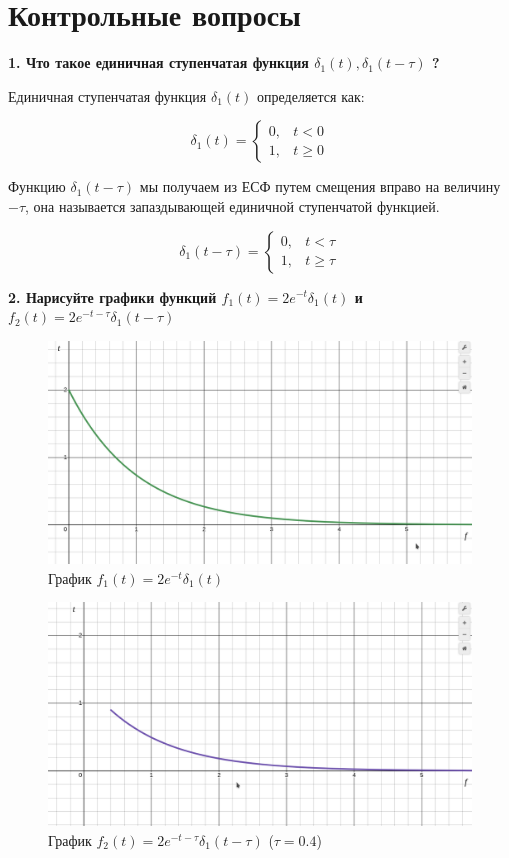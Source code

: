 \section{Контрольные вопросы}

\textbf{
    1. Что такое единичная ступенчатая функция
    $ \delta_{1}(t), \delta_{1}(t-\tau) $ ?
}

Единичная ступенчатая функция $ \delta_{1}(t) $ 
определяется как:

\begin{equation}\label{eq:esf}
\delta_{1}(t) = 
\begin{cases}
    0, & t < 0\\
    1, & t \ge 0
\end{cases}
\end{equation}

Функцию $ \delta_{1}(t-\tau) $  мы получаем из ЕСФ путем смещения вправо на величину $ -\tau $, она называется запаздывающей единичной ступенчатой функцией.

\begin{equation}\label{eq:esft}
\delta_{1}(t-\tau) = 
\begin{cases}
0, & t < \tau\\
1, & t \ge \tau
\end{cases}
\end{equation} 

\textbf{
    2. Нарисуйте графики функций 
    $ f_{1}(t) = 2 e^{-t} \delta_{1}(t) $ и 
    $ f_{2}(t) = 2 e^{-t-\tau} \delta_{1} (t-\tau) $
}

\begin{figure}[H]
    \centering
    \includegraphics[width=0.7\linewidth]{photo/q2_1}
    \caption{График $ f_{1}(t) = 2 e^{-t} \delta_{1}(t) $}
    \label{fig:q2_1}
\end{figure}

\begin{figure}[H]
    \centering
    \includegraphics[width=0.7\linewidth]{photo/q2_2}
    \caption{График $ f_{2}(t) = 2 e^{-t-\tau} \delta_{1} (t-\tau) $ ($ \tau = 0.4 $)}
    \label{fig:q2_2}
\end{figure}

